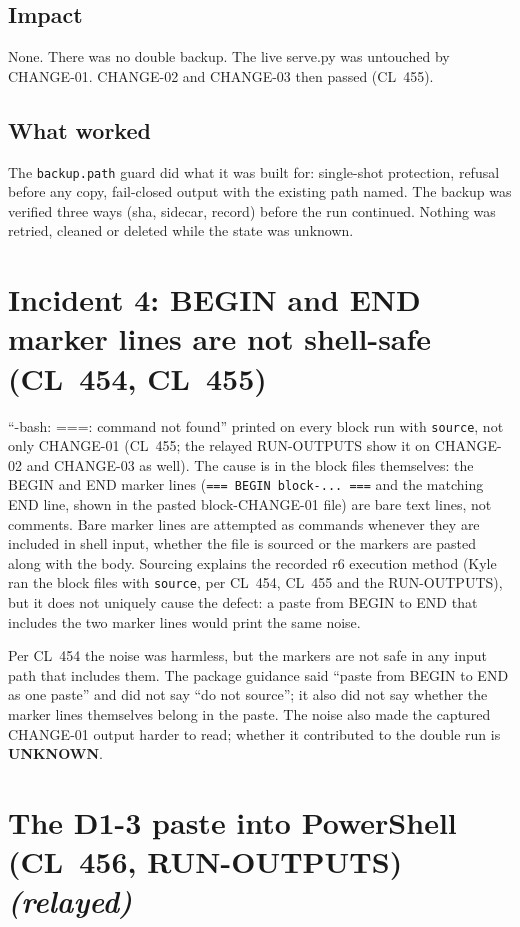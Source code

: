 \documentclass[10pt]{article}
\newcommand{\CL}[1]{CL~#1}
\newcommand{\relay}{\textit{(relayed)}}
\newcommand{\unk}{\textbf{UNKNOWN}}
\begin{document}
\subsection{Impact}

None. There was no double backup. The live serve.py was untouched by CHANGE-01. CHANGE-02 and CHANGE-03 then passed (\CL{455}).

\subsection{What worked}

The \texttt{backup.path} guard did what it was built for: single-shot protection, refusal before any copy, fail-closed output with the existing path named. The backup was verified three ways (sha, sidecar, record) before the run continued. Nothing was retried, cleaned or deleted while the state was unknown.

\section{Incident 4: BEGIN and END marker lines are not shell-safe (\CL{454}, \CL{455})}

``-bash: ===: command not found'' printed on every block run with \texttt{source}, not only CHANGE-01 (\CL{455}; the relayed RUN-OUTPUTS show it on CHANGE-02 and CHANGE-03 as well). The cause is in the block files themselves: the BEGIN and END marker lines (\texttt{=== BEGIN block-... ===} and the matching END line, shown in the pasted block-CHANGE-01 file) are bare text lines, not comments. Bare marker lines are attempted as commands whenever they are included in shell input, whether the file is sourced or the markers are pasted along with the body. Sourcing explains the recorded r6 execution method (Kyle ran the block files with \texttt{source}, per \CL{454}, \CL{455} and the RUN-OUTPUTS), but it does not uniquely cause the defect: a paste from BEGIN to END that includes the two marker lines would print the same noise.

Per \CL{454} the noise was harmless, but the markers are not safe in any input path that includes them. The package guidance said ``paste from BEGIN to END as one paste'' and did not say ``do not source''; it also did not say whether the marker lines themselves belong in the paste. The noise also made the captured CHANGE-01 output harder to read; whether it contributed to the double run is \unk{}.

\section{The D1-3 paste into PowerShell (\CL{456}, RUN-OUTPUTS) \relay{}}
\end{document}
